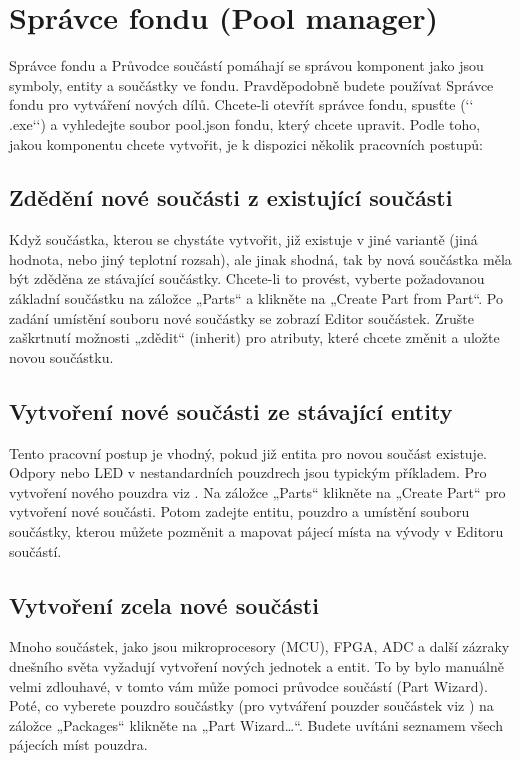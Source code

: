 \documentclass[letterpaper,10pt,czech]{sphinxmanual}
\begin{document}
\chapter{Správce fondu (Pool manager)}
\label{\detokenize{pool-mgr:spravce-fondu-pool-manager}}\label{\detokenize{pool-mgr::doc}}
Správce fondu a Průvodce součástí pomáhají se správou komponent jako jsou symboly, entity a součástky ve fondu. Pravděpodobně budete používat Správce fondu pro vytváření nových dílů. Chcete-li otevřít správce fondu, spusťte  ({}`{}` .exe{}`{}`) a vyhledejte soubor pool.json fondu, který
chcete upravit. Podle toho, jakou komponentu chcete vytvořit, je k dispozici několik pracovních postupů:


\section{Zdědění nové součásti z existující součásti}
\label{\detokenize{pool-mgr:zdedeni-nove-soucasti-z-existujici-soucasti}}
Když součástka, kterou se chystáte vytvořit, již existuje v jiné variantě (jiná hodnota, nebo jiný teplotní rozsah), ale jinak shodná, tak by nová součástka měla být zděděna ze stávající součástky. Chcete-li to provést, vyberte požadovanou základní součástku na záložce „Parts“ a klikněte na „Create Part from Part“. Po zadání umístění souboru nové součástky se zobrazí Editor součástek. Zrušte zaškrtnutí možnosti „zdědit“ (inherit) pro atributy, které chcete změnit a uložte novou součástku.


\section{Vytvoření nové součásti ze stávající entity}
\label{\detokenize{pool-mgr:vytvoreni-nove-soucasti-ze-stavajici-entity}}
Tento pracovní postup je vhodný, pokud již entita pro novou součást
existuje. Odpory nebo LED v nestandardních pouzdrech jsou typickým příkladem. Pro vytvoření nového pouzdra viz {\hyperref[\detokenize{create-package::doc}]{}}. Na záložce „Parts“ klikněte na „Create Part“ pro vytvoření nové součásti. Potom zadejte entitu, pouzdro a umístění souboru součástky, kterou můžete pozměnit a mapovat pájecí místa na vývody v Editoru součástí.


\section{Vytvoření zcela nové součásti}
\label{\detokenize{pool-mgr:vytvoreni-zcela-nove-soucasti}}
Mnoho součástek, jako jsou mikroprocesory (MCU), FPGA, ADC a další zázraky dnešního světa
vyžadují vytvoření nových jednotek a entit. To by bylo manuálně velmi zdlouhavé, v tomto vám může pomoci průvodce součástí (Part Wizard). Poté, co vyberete pouzdro součástky (pro vytváření pouzder součástek viz {\hyperref[\detokenize{create-package::doc}]{}}) na záložce „Packages“ klikněte na „Part Wizard…“. Budete uvítáni seznamem všech pájecích míst pouzdra.
\end{document}
